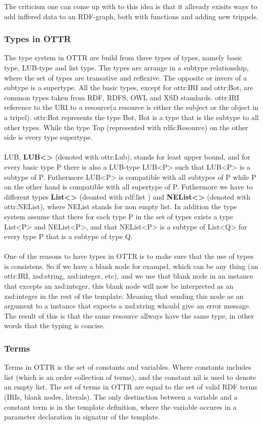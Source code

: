 The criticism one can come up with to this idea is that it allready exisits ways to add inffered data to an RDF-graph, both 
with functions and adding new trippels. 

\subsubsection{Types in OTTR}
The type system in OTTR are build from three types of types, namely basic type, LUB-type and list type. The types are arrange in 
a subtype relationship, where the set of types are transative and reflexive. The opposite or invers of a subtype is a supertype.
All the basic types, except for ottr:IRI and ottr:Bot, are common types taken from RDF, RDFS, OWL and XSD standards. ottr:IRI reference 
to the URI to a resource(a resource is either the subject or the object in a tripel). ottr:Bot represents the type Bot, Bot is a type that 
is the subtype to all other types. While the type Top (represented with rdfs:Resource) on the other side is every type supertype.
\\ \\
LUB, \textbf{LUB<>} (denoted with ottr:Lub), stands for least upper bound, and for every basic type P there is also a LUB-type LUB<P> such that LUB<P> is 
a subtype of P. Futhermore LUB<P> is compatible with all subtypes of P while P on the other hand is compatible with all supertype of P. 
Futhermore we have to different types \textbf{List<>} (deonted with rdf:list ) and \textbf{NEList<>} (denoted with ottr:NEList), where 
NEList stands for non empty list. In addition the 
type system assume that there for each type P in the set of types exists a type List<P> and NEList<P>, and that 
NEList<P> is a subtype of List<Q> for every type P that is a subtype of type Q.
\\ \\
One of the reasons to have types in OTTR is to make sure that the use of types is consistens. So
if we have a blank node for exampel, which can be any thing (an ottr:IRI, xsd:string, xsd:integer, etc), and we use that blank node 
in an instance that excepts an xsd:integer, this blank node will now be interpreted as an xsd:integer in the rest of the template. 
Meaning that sending this node as an argument to a instance that expects a xsd:string whould give an error message. The result of this 
is that the same resource allways have the same type, in other words that the typing is concise. 

\subsubsection{Terms}
Terms in OTTR is the set of constants and variables. Where constants includes list (which is an order collection of terms), and
the constant nil is used to denote an empty list. The set of terms in OTTR are equal to the set of valid RDF terms (IRIs, blank nodes, literals).
The only destinction between a variable and a constant term is in the template definition, where the 
variable occures in a parameter declaration in signatur of the template.
